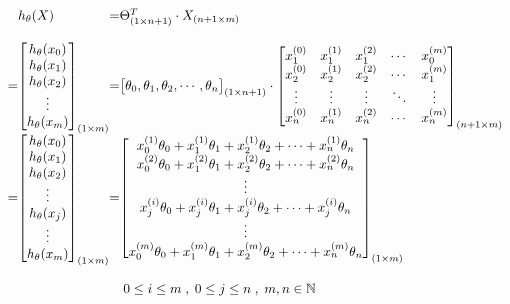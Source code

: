 \[
	\begin{array}{ l@{} l@{} l@{} l@{}} 
	& h_\theta (X)
	& = & \Theta_{(1 \times n+1)}^{T} \cdot X_{(n+1 \times m)} \\ 
	\\ 
	= &
	\begin{bmatrix} 
		h_\theta(x_{0}) \\
		h_\theta(x_{1}) \\
		h_\theta(x_{2}) \\
		\vdots \\
		h_\theta(x_{m}) \\ 
	\end{bmatrix}_{(1 \times m)} 
	& = & 
	\begin{bmatrix} 
		\theta_0 ,
		\theta_1 ,
		\theta_2 ,
		\cdots ,
		\theta_n 
	\end{bmatrix}_{(1 \times n+1)} 
	\cdot 
	\begin{bmatrix} 
		x_{1}^{(0)} & x_{1}^{(1)} & x_{1}^{(2)} & \cdots & x_{0}^{(m)} \\
		x_{2}^{(0)} & x_{2}^{(1)} & x_{2}^{(2)} &\cdots & x_{1}^{(m)} \\ 
		\vdots & \vdots & \vdots & \ddots & \vdots \\ 
		x_{n}^{(0)} & x_{n}^{(1)} & x_{n}^{(2)} &\cdots & x_{n}^{(m)} \\ 
	\end{bmatrix}_{(n+1 \times m)} \\ 
	= &
	\begin{bmatrix} 
		h_\theta(x_{0}) \\
		h_\theta(x_{1}) \\
		h_\theta(x_{2}) \\ 
		\vdots \\ 
		h_\theta(x_{j}) \\ 
		\vdots \\ 
		h_\theta(x_{m}) \\ 
	\end{bmatrix}_{(1 \times m)} 
	& = &
	\begin{bmatrix} 
		x_{0}^{(1)} \theta_0 +
		x_{1}^{(1)} \theta_1 +
		x_{2}^{(1)} \theta_2 +
		\cdots +
		x_{n}^{(1)} \theta_n \\ 
		x_{0}^{(2)} \theta_0 +
		x_{1}^{(2)} \theta_1 +
		x_{2}^{(2)} \theta_2 +
		\cdots +
		x_{n}^{(2)} \theta_n \\ 
		\vdots \\ 
		x_{j}^{(i)} \theta_0 +
		x_{j}^{(i)} \theta_1 +
		x_{j}^{(i)} \theta_2 +
		\cdots +
		x_{j}^{(i)} \theta_n \\ 
		\vdots \\ 
		x_{0}^{(m)} \theta_0 +
		x_{1}^{(m)} \theta_1 +
		x_{2}^{(m)} \theta_2 +
		\cdots +
		x_{n}^{(m)} \theta_n \\ 
	\end{bmatrix}_{(1 \times m)} 
	\\
	\\
	& & &
	\; 0 \leq i \leq m \; ,
	\; 0 \leq j \leq n \; ,
	\; m , n \in \mathbb{N} 
	\end{array}
	\] 


